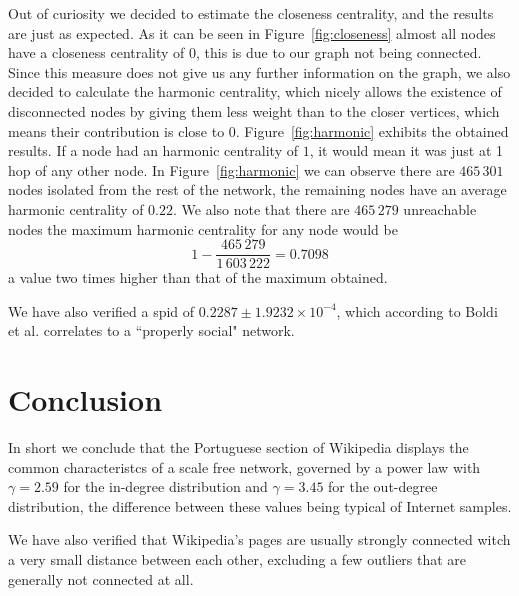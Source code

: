 \documentclass[9pt,a4paper,twocolumn,notitlepage]{article}
\begin{document}
Out of curiosity we decided to estimate the closeness centrality, and the results are just as expected. As it can be seen in Figure~\ref{fig:closeness} almost all nodes have a closeness centrality of 0, this is due to our graph not being connected. Since this measure does not give us any further information on the graph, we also decided to calculate the harmonic centrality, which nicely allows the existence of disconnected nodes by giving them less weight than to the closer vertices, which means their contribution is close to 0. Figure~\ref{fig:harmonic} exhibits the obtained results. If a node had an harmonic centrality of $1$, it would mean it was just at 1 hop of any other node. In Figure~\ref{fig:harmonic} we can observe there are $465\,301$ nodes isolated from the rest of the network, the remaining nodes have an average harmonic centrality of $0.22$. We also note that there are $465\,279$ unreachable nodes the maximum harmonic centrality for any node would be $$1-\frac{465\,279}{1\,603\,222}=0.7098$$
a value two times higher than that of the maximum obtained.

We have also verified a \acrfull{spid} of $0.2287 \pm 1.9232 \times 10^{-4}$, which according to Boldi et al. \cite{Boldi2011HyperANFAT} correlates to a ``properly social" network.

\section{Conclusion}

In short we conclude that the Portuguese section of Wikipedia displays the common characteristcs of a scale free network, governed by a power law with $\gamma = 2.59$ for the in-degree distribution and $\gamma = 3.45$ for the out-degree distribution, the difference between these values being typical of Internet samples.

We have also verified that Wikipedia's pages are usually strongly connected witch a very small distance between each other, excluding a few outliers that are generally not connected at all.

\printglossary[type=\acronymtype]



\end{document}
